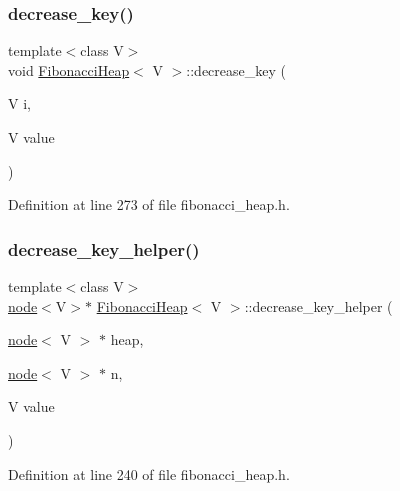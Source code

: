 \subsubsection{\texorpdfstring{decrease\+\_\+key()}{decrease\_key()}}
{\footnotesize\ttfamily template$<$class V$>$ \\
void \hyperlink{class_fibonacci_heap}{Fibonacci\+Heap}$<$ V $>$\+::decrease\+\_\+key (\begin{DoxyParamCaption}\item[{V}]{i,  }\item[{V}]{value }\end{DoxyParamCaption})\hspace{0.3cm}{\ttfamily [inline]}}



Definition at line 273 of file fibonacci\+\_\+heap.\+h.

\mbox{\label{class_fibonacci_heap_ab97deb5ff0e3944eba71a1ba5d99d2b6}} 
\subsubsection{\texorpdfstring{decrease\+\_\+key\+\_\+helper()}{decrease\_key\_helper()}}
{\footnotesize\ttfamily template$<$class V$>$ \\
\hyperlink{structnode}{node}$<$V$>$$\ast$ \hyperlink{class_fibonacci_heap}{Fibonacci\+Heap}$<$ V $>$\+::decrease\+\_\+key\+\_\+helper (\begin{DoxyParamCaption}\item[{\hyperlink{structnode}{node}$<$ V $>$ $\ast$}]{heap,  }\item[{\hyperlink{structnode}{node}$<$ V $>$ $\ast$}]{n,  }\item[{V}]{value }\end{DoxyParamCaption})\hspace{0.3cm}{\ttfamily [inline]}}



Definition at line 240 of file fibonacci\+\_\+heap.\+h.

\mbox{\label{class_fibonacci_heap_a2726ce00ae9e20ef8bd88a1bf2f41313}} 
